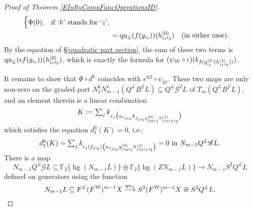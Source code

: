 \documentclass[11pt]{amsart} \renewcommand{\baselinestretch}{1.2}
\theoremstyle{plain}
\numberwithin{equation}{section} %
\theoremstyle{plain}
\numberwithin{equation}{chapter} %
\DeclareMathOperator{\homog}{hg}
\renewcommand{\to}{\longrightarrow}
\newcommand{\scrG}{\mathscr{G}}
\newcommand{\calL}{\mathcal{L}}
\newcommand{\calw}{\mathcal{W}}
\newcommand{\call}{\mathcal{L}}
\newcommand{\BSW}{{\scrG}}
\newcommand{\BSWres}{B^\BSW}%
\newcommand{\quadratic}{\mathrm{qu}}
\newcommand{\F}{\mathbb{F}}
\newcommand{\Ftwo}{\F_2}
\newcommand{\uver}{^\mathrm{v}}
\newcommand{\uhor}{^\mathrm{h}}
\begin{document}
\begin{Operations in composite functor spectral sequences}
\begin{proof}[Proof of Theorem \ref{EInftyCompFuncOperationsID}]
\begin{alignat*}{2}
\begin{cases}
\Phi(0),&\textup{if `$k$' stands for `$z$'},
\end{cases}\\
&={\quadratic_\call}(f(g_{i_1}))(h^{\smash{\langle} 0\smash{\rangle}}_{i_1i_2})\quad\textup{(in either case).}
\end{alignat*}
By the equation of \S\ref{quadratic part section}, the sum of these two terms is ${\quadratic_\call}(\epsilon f(g_{i_1}))(h^{\smash{\langle} 0\smash{\rangle}}_{i_1i_2})$, which is exactly the formula for $(\psi_{\calw}\circ\epsilon)(k_{f\relax (g^{\smash{\langle} 0\smash{\rangle}}_{i_1}(h^{\smash{\langle} 1\smash{\rangle}}_{i_1i_2}))})$.

It remains to show that $\Phi\circ d\uhor$ coincides with $\epsilon^{\otimes 2}\circ\psi_{\calw}$. These two maps are only non-zero on the graded part $N\uhor_1N\uver_{m-1}(Q^{\call}\BSWres L)\subseteq Q^{\calL}\BSW^2 L$ of  $T_{m}(Q^{\calL}\BSWres L)$, and an element therein is a linear combination
\[K:=\textstyle\sum_j k_{e_j\bigl(\smash{s_{\alpha_{ji_0}} k_{f\relax _{ji_0}g^{\smash{\langle} 0\smash{\rangle}}_{ji_0i_1}h^{\smash{\langle} 1\smash{\rangle}}_{ji_0i_1i_2}}}\bigr)}\]
which satisfies the equation $d\uhor_1(K)=0$, i.e.:
\[d\uhor_1(K)=\textstyle\sum_j \smash{k_{e_j(f_{ji_0})\left(s_{\alpha_{ji_0}} {g^{\smash{\langle} 0\smash{\rangle}}_{ji_0i_1}h^{\smash{\langle} 1\smash{\rangle}}_{ji_0i_1i_2}}\right)}}=0\textup{ in }N_{m-1}Q^{\calL}\BSW L.\]
%
%
There is a map 
\[N_{m-1}Q^{\calL}\BSW L \subseteq \Ftwo \{\homog( N_{m-1}L)\} \oplus \Ftwo \{\homog( ZN_{m-1}L)\}\to N_{m-1}S^2Q^{\calL}L\]
defined on generators using the function
\[N_{m-1}L\subseteq F^{\calL}(F^{\calw})^{m-1}X \smash{{}\overset{\quadratic_\call}{\to}{}}S^2(F^{\calw})^{m-1}X\cong S^2Q^{\calL}L.\]

\end{proof}
\end{Operations in composite functor spectral sequences}
\end{document}
